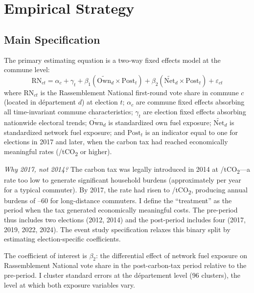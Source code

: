 \documentclass[12pt]{article}
\newcommand{\rn}{Rassemblement National}
\newcommand{\dept}{d\'{e}partement}
\begin{document}

\section{Empirical Strategy}
\label{sec:strategy}

\subsection{Main Specification}

The primary estimating equation is a two-way fixed effects model at the commune level:
\begin{equation}
\text{RN}_{ct} = \alpha_c + \gamma_t + \beta_1 \left(\widetilde{\text{Own}}_d \times \text{Post}_t\right) + \beta_2 \left(\widetilde{\text{Net}}_d \times \text{Post}_t\right) + \varepsilon_{ct}
\label{eq:main_spec}
\end{equation}
where $\text{RN}_{ct}$ is the \rn{} first-round vote share in commune $c$ (located in \dept{} $d$) at election $t$; $\alpha_c$ are commune fixed effects absorbing all time-invariant commune characteristics; $\gamma_t$ are election fixed effects absorbing nationwide electoral trends; $\widetilde{\text{Own}}_d$ is standardized own fuel exposure; $\widetilde{\text{Net}}_d$ is standardized network fuel exposure; and $\text{Post}_t$ is an indicator equal to one for elections in 2017 and later, when the carbon tax had reached economically meaningful rates (/tCO\textsubscript{2} or higher).

\textit{Why 2017, not 2014?} The carbon tax was legally introduced in 2014 at /tCO\textsubscript{2}---a rate too low to generate significant household burdens (approximately  per year for a typical commuter). By 2017, the rate had risen to /tCO\textsubscript{2}, producing annual burdens of --60 for long-distance commuters. I define the ``treatment'' as the period when the tax generated economically meaningful costs. The pre-period thus includes two elections (2012, 2014) and the post-period includes four (2017, 2019, 2022, 2024). The event study specification relaxes this binary split by estimating election-specific coefficients.

The coefficient of interest is $\beta_2$: the differential effect of network fuel exposure on \rn{} vote share in the post-carbon-tax period relative to the pre-period. I cluster standard errors at the \dept{} level (96 clusters), the level at which both exposure variables vary.
\end{document}
